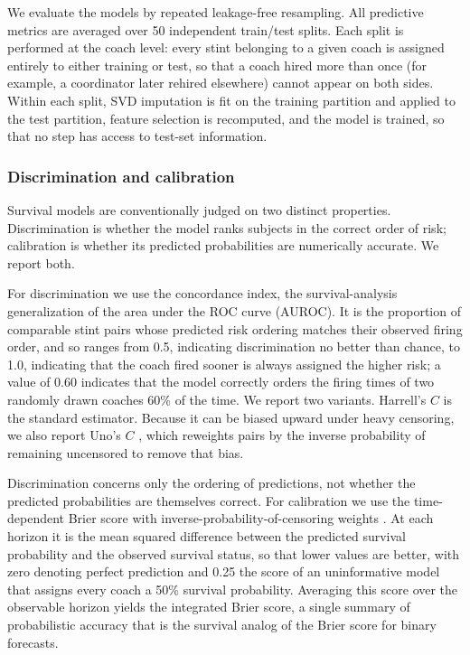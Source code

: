 \documentclass[USenglish]{article}
\theoremstyle{dgthm}
\theoremstyle{dgdef}
\begin{document}
We evaluate the models by repeated leakage-free resampling. All predictive metrics are averaged over 50 independent train/test splits. Each split is performed at the coach level: every stint belonging to a given coach is assigned entirely to either training or test, so that a coach hired more than once (for example, a coordinator later rehired elsewhere) cannot appear on both sides. Within each split, SVD imputation is fit on the training partition and applied to the test partition, feature selection is recomputed, and the model is trained, so that no step has access to test-set information.

\subsubsection{Discrimination and calibration}

Survival models are conventionally judged on two distinct properties. Discrimination is whether the model ranks subjects in the correct order of risk; calibration is whether its predicted probabilities are numerically accurate. We report both.

For discrimination we use the concordance index, the survival-analysis generalization of the area under the ROC curve (AUROC). It is the proportion of comparable stint pairs whose predicted risk ordering matches their observed firing order, and so ranges from 0.5, indicating discrimination no better than chance, to 1.0, indicating that the coach fired sooner is always assigned the higher risk; a value of 0.60 indicates that the model correctly orders the firing times of two randomly drawn coaches 60\% of the time. We report two variants. Harrell's $C$ \citep{harrell1996} is the standard estimator. Because it can be biased upward under heavy censoring, we also report Uno's $C$ \citep{uno2011}, which reweights pairs by the inverse probability of remaining uncensored to remove that bias.

Discrimination concerns only the ordering of predictions, not whether the predicted probabilities are themselves correct. For calibration we use the time-dependent Brier score with inverse-probability-of-censoring weights \citep{graf1999}. At each horizon it is the mean squared difference between the predicted survival probability and the observed survival status, so that lower values are better, with zero denoting perfect prediction and 0.25 the score of an uninformative model that assigns every coach a 50\% survival probability. Averaging this score over the observable horizon yields the integrated Brier score, a single summary of probabilistic accuracy that is the survival analog of the Brier score for binary forecasts.
\end{document}
